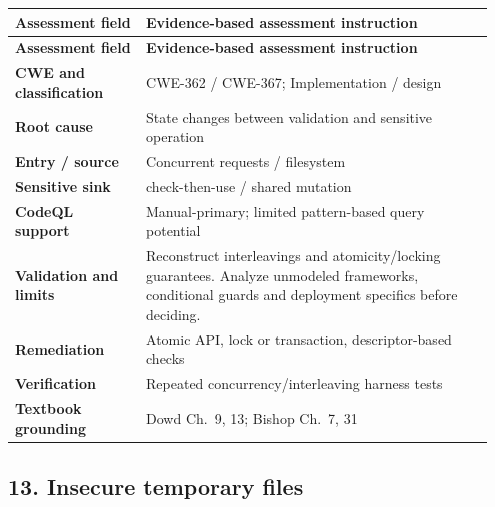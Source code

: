 \documentclass[11pt,letterpaper,oneside]{book}
\begin{document}
\small
\setlength{\tabcolsep}{2pt}
\renewcommand{\arraystretch}{1.18}
\begin{longtable}{>{\raggedright\arraybackslash}p{0.26\linewidth}>{\raggedright\arraybackslash}p{0.69\linewidth}}
\toprule
\textbf{Assessment field} & \textbf{Evidence-based assessment instruction}\\
\midrule
\endfirsthead
\toprule
\textbf{Assessment field} & \textbf{Evidence-based assessment instruction}\\
\midrule
\endhead
\textbf{CWE and classification} & CWE-362 / CWE-367; Implementation / design\\
\textbf{Root cause} & State changes between validation and sensitive operation\\
\textbf{Entry / source} & Concurrent requests / filesystem\\
\textbf{Sensitive sink} & check-then-use / shared mutation\\
\textbf{CodeQL support} & Manual-primary; limited pattern-based query potential\\
\textbf{Validation and limits} & Reconstruct interleavings and atomicity/locking guarantees. Analyze unmodeled frameworks, conditional guards and deployment specifics before deciding.\\
\textbf{Remediation} & Atomic API, lock or transaction, descriptor-based checks\\
\textbf{Verification} & Repeated concurrency/interleaving harness tests\\
\textbf{Textbook grounding} & Dowd Ch.~9, 13; Bishop Ch.~7, 31\\
\bottomrule
\end{longtable}
\normalsize

\subsection{13. Insecure temporary files}
\end{document}
